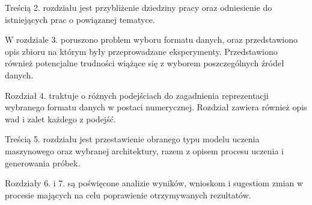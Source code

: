 {{        Treścią 2. rozdziału jest przybliżenie dziedziny pracy oraz odniesienie do istniejących prac o\,\,powiązanej tematyce.
        
        W\,\,rozdziale 3. poruszono problem wyboru formatu danych, oraz przedstawiono opis zbioru na którym
        były przeprowadzane eksperymenty. Przedstawiono również potencjalne trudności wiążące się z\,\,wyborem
        poszczególnych źródeł danych.

        Rozdział 4. traktuje o\,\,różnych podejściach do zagadnienia reprezentacji wybranego formatu 
        danych w\,\,postaci numerycznej. Rozdział zawiera również opis wad i\,\,zalet każdego z\,\,podejść.

        Treścią 5. rozdziału jest przestawienie obranego typu modelu uczenia maszynowego oraz 
        wybranej architektury, razem z\,\,opisem procesu uczenia i generowania próbek.

        Rozdziały 6. i\,\,7. są poświęcone analizie wyników, wnioskom i\,\,sugestiom zmian w\,\,procesie mających na celu 
        poprawienie otrzymywanych rezultatów.
    }
}


